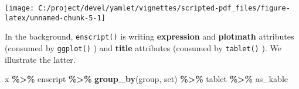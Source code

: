 \documentclass[
]{article}
\newenvironment{Shaded}{\begin{snugshade}}{\end{snugshade}}
\newcommand{\FunctionTok}[1]{\textcolor[rgb]{0.13,0.29,0.53}{\textbf{#1}}}
\newcommand{\NormalTok}[1]{#1}
\newcommand{\SpecialCharTok}[1]{\textcolor[rgb]{0.81,0.36,0.00}{\textbf{#1}}}
\begin{document}
\texttt{[image: C:/project/devel/yamlet/vignettes/scripted-pdf\_files/figure-latex/unnamed-chunk-5-1]}

In the background, \texttt{enscript()} is writing \textbf{expression}
and \textbf{plotmath} attributes (consumed by \texttt{ggplot()} ) and
\textbf{title} attributes (consumed by \texttt{tablet()} ). We
illustrate the latter.

\begin{Shaded}
\begin{Highlighting}[]
\NormalTok{x }\SpecialCharTok{\%\textgreater{}\%} 
\NormalTok{  enscript }\SpecialCharTok{\%\textgreater{}\%} 
  \FunctionTok{group\_by}\NormalTok{(group, set) }\SpecialCharTok{\%\textgreater{}\%}
\NormalTok{  tablet }\SpecialCharTok{\%\textgreater{}\%}
\NormalTok{  as\_kable}
\end{Highlighting}
\end{Shaded}
\end{document}
